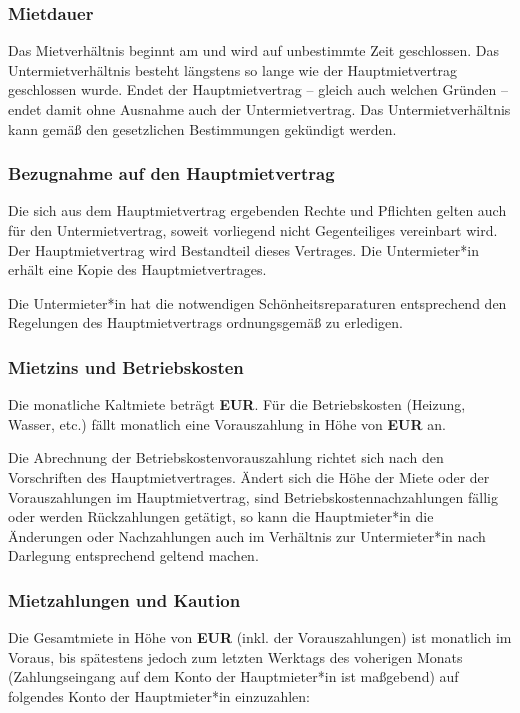 
\subsubsection*{Mietdauer}

Das Mietverhältnis beginnt am \textbf{\CONTRACTdate} und wird auf
unbestimmte Zeit geschlossen. Das Untermietverhältnis besteht längstens so
lange wie der Hauptmietvertrag geschlossen wurde. Endet der
Hauptmietvertrag -- gleich auch welchen Gründen -- endet damit ohne
Ausnahme auch der Untermietvertrag. Das Untermietverhältnis kann gemäß den
gesetzlichen Bestimmungen gekündigt werden.

\subsubsection*{Bezugnahme auf den Hauptmietvertrag}

Die sich aus dem Hauptmietvertrag ergebenden Rechte und Pflichten gelten
auch für den Untermietvertrag, soweit vorliegend nicht Gegenteiliges
vereinbart wird. Der Hauptmietvertrag wird Bestandteil dieses
Vertrages. Die Untermieter*in erhält eine Kopie des Hauptmietvertrages.

Die Untermieter*in hat die notwendigen Schönheitsreparaturen
entsprechend den Regelungen des Hauptmietvertrags ordnungsgemäß zu
erledigen.

\subsubsection*{Mietzins und Betriebskosten}

Die monatliche Kaltmiete beträgt \textbf{\CONTRACTcold{} EUR}. Für die
Betriebskosten (Heizung, Wasser, etc.) fällt monatlich eine Vorauszahlung
in Höhe von \textbf{\CONTRACTwarm{} EUR} an.

Die Abrechnung der Betriebskostenvorauszahlung richtet sich nach den
Vorschriften des Hauptmietvertrages. Ändert sich die Höhe der Miete oder
der Vorauszahlungen im Hauptmietvertrag, sind Betriebskostennachzahlungen
fällig oder werden Rückzahlungen getätigt, so kann die Hauptmieter*in
die Änderungen oder Nachzahlungen auch im Verhältnis zur Untermieter*in
nach Darlegung entsprechend geltend machen.

\subsubsection*{Mietzahlungen und Kaution}

Die Gesamtmiete in Höhe von \textbf{\CONTRACTtotal{} EUR} (inkl. der
Vorauszahlungen) ist monatlich im Voraus, bis spätestens jedoch zum letzten
Werktags des voherigen Monats (Zahlungseingang auf dem Konto der
Hauptmieter*in ist maßgebend) auf folgendes Konto der Hauptmieter*in
einzuzahlen:

